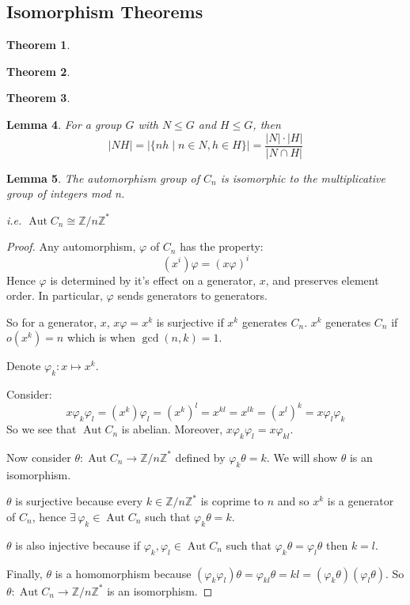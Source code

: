 \documentclass[a4paper, oneside, 12pt, final]{article}
\newtheorem{theorem}{Theorem}[section]
\newtheorem{lemma}[theorem]{Lemma}
\theoremstyle{definition}
\DeclareMathOperator{\Aut}{Aut}
\newcommand{\Z}{\mathbb{Z}}
\newcommand{\Zn}[1]{\Z/#1\Z}
\begin{document}
\subsection{Isomorphism Theorems}
\begin{theorem}
\label{thm:iso1}
\end{theorem}

\begin{theorem}
\label{thm:iso2}
\end{theorem}

\begin{theorem}
\label{thm:iso3}
\end{theorem}

\begin{lemma}
\label{lem:setprodorder}
    For a group \(G\) with \(N \leqslant G\) and \(H \leqslant G\), then
    \[|NH| = |\{nh \mid n \in N, h \in H\}| = \frac{|N| \cdot |H|}{|N \cap H|}\]
\end{lemma}

\begin{lemma}
\label{lem:aut}
    The automorphism group of \(C_n\) is isomorphic to the multiplicative group of integers mod n.

    i.e. \(\Aut{C_n} \cong \Zn{n}^*\)
\end{lemma}

\begin{proof}
    Any automorphism, \(\varphi\) of \(C_n\) has the property:
    \[(x^i)\varphi = (x\varphi)^i\]
    Hence \(\varphi\) is determined by it's effect on a generator, \(x\), and
    preserves element order.
    In particular, \(\varphi\) sends generators to generators.

    So for a generator, \(x\), \(x\varphi = x^k\) is surjective if \(x^k\)
    generates \(C_n\).
    \(x^k\) generates \(C_n\) if \(o(x^k) = n\) which is when \(\gcd{(n, k)} =
    1\).

    Denote \(\varphi_k:x \mapsto x^k\).

    Consider:
    \[x\varphi_k\varphi_l = (x^k)\varphi_l = (x^k)^l = x^{kl} = x^{lk} =
    (x^l)^k = x\varphi_l\varphi_k\]
    So we see that \(\Aut{C_n}\) is abelian.
    Moreover, \(x\varphi_k\varphi_l = x\varphi_{kl}\).

    Now consider \(\theta:\Aut{C_n} \to \Zn{n}^*\) defined by \(\varphi_k\theta
    = k\).
    We will show \(\theta\) is an isomorphism.

    \(\theta\) is surjective because every \(k \in \Zn{n}^*\) is coprime to
    \(n\) and so \(x^k\) is a generator of \(C_n\), hence \(\exists\,\varphi_k
    \in \Aut{C_n}\) such that \(\varphi_k\theta = k\).

    \(\theta\) is also injective because if \(\varphi_k, \varphi_l \in
    \Aut{C_n}\) such that \(\varphi_k\theta = \varphi_l\theta\) then \(k = l\).

    Finally, \(\theta\) is a homomorphism because \((\varphi_k\varphi_l)\theta =
    \varphi_{kl}\theta = kl = (\varphi_k\theta)(\varphi_l\theta)\).
    So \(\theta:\Aut{C_n} \to \Zn{n}^*\) is an isomorphism.

\end{proof}
\end{document}
